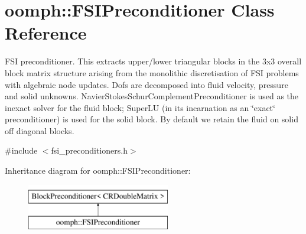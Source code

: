 \hypertarget{classoomph_1_1FSIPreconditioner}{}\section{oomph\+:\+:F\+S\+I\+Preconditioner Class Reference}
\label{classoomph_1_1FSIPreconditioner}


F\+SI preconditioner. This extracts upper/lower triangular blocks in the 3x3 overall block matrix structure arising from the monolithic discretisation of F\+SI problems with algebraic node updates. Dofs are decomposed into fluid velocity, pressure and solid unknowns. Navier\+Stokes\+Schur\+Complement\+Preconditioner is used as the inexact solver for the fluid block; Super\+LU (in its incarnation as an \char`\"{}exact\char`\"{} preconditioner) is used for the solid block. By default we retain the fluid on solid off diagonal blocks.  




{\ttfamily \#include $<$fsi\+\_\+preconditioners.\+h$>$}

Inheritance diagram for oomph\+:\+:F\+S\+I\+Preconditioner\+:\begin{figure}[H]
\begin{center}
\leavevmode
\includegraphics[height=2.000000cm]{classoomph_1_1FSIPreconditioner}
\end{center}
\end{figure}
